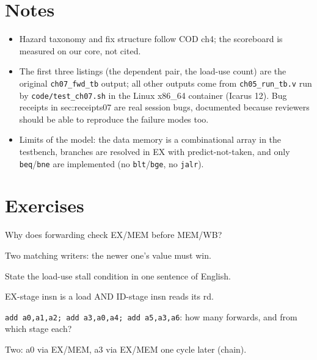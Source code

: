 \section*{Notes}
\label{sec:notes07}
\begin{itemize}
\item Hazard taxonomy and fix structure follow COD ch4; the
      scoreboard is measured on our core, not cited.
\item The first three listings (the dependent pair, the load-use
      count) are the original \texttt{ch07\_fwd\_tb} output; all other
      outputs come from \texttt{ch05\_run\_tb.v} run by
      \texttt{code/test\_ch07.sh} in the Linux x86\_64 container
      (Icarus 12). Bug receipts in sec:receipts07 are real session bugs,
      documented because reviewers should be able to reproduce the
      failure modes too.
\item Limits of the model: the data memory is a combinational array in
      the testbench, branches are resolved in EX with predict-not-taken,
      and only \texttt{beq}/\texttt{bne} are implemented (no
      \texttt{blt}/\texttt{bge}, no \texttt{jalr}).
\end{itemize}

\section{Exercises}
\label{sec:exercises07}

\begin{exercise}[easy]\label{ex:e07a}
Why does forwarding check EX/MEM before MEM/WB?
\end{exercise}
\begin{solution}[hint]
Two matching writers: the newer one's value must win.
\end{solution}

\begin{exercise}[easy]\label{ex:e07b}
State the load-use stall condition in one sentence of English.
\end{exercise}
\begin{solution}[hint]
EX-stage insn is a load AND ID-stage insn reads its rd.
\end{solution}

\begin{exercise}[medium]\label{ex:m07a}
\texttt{add a0,a1,a2; add a3,a0,a4; add a5,a3,a6}: how many
forwards, and from which stage each?
\end{exercise}
\begin{solution}[hint]
Two: a0 via EX/MEM, a3 via EX/MEM one cycle later (chain).
\end{solution}

